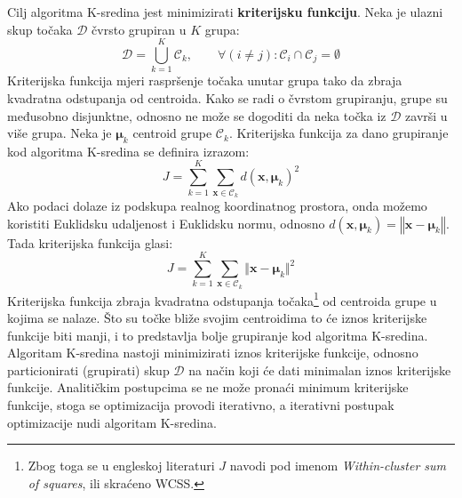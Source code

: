 \documentclass[times, utf8, zavrsni]{fer}
\begin{document}
Cilj algoritma K-sredina jest minimizirati \textbf{kriterijsku funkciju}. Neka je ulazni skup točaka $\mathcal{D}$ čvrsto grupiran u $K$ grupa:
\[\mathcal{D} = \bigcup_{k=1}^{K} \mathcal{C}_k, \qquad \forall \left(i \neq j\right) :  \mathcal{C}_i \cap \mathcal{C}_j = \emptyset\]
Kriterijska funkcija mjeri raspršenje točaka unutar grupa tako da zbraja kvadratna odstupanja od centroida.
Kako se radi o čvrstom grupiranju, grupe su međusobno disjunktne, odnosno ne može se dogoditi da neka točka iz $\mathcal{D}$ završi u više grupa. Neka je $\boldsymbol{\mu}_k$ centroid grupe $\mathcal{C}_k$. Kriterijska funkcija za dano grupiranje kod algoritma K-sredina se definira izrazom:
\[J = \sum_{k=1}^{K} \sum_{\mathbf{x} \in \mathcal{C}_k} 
d \left(\mathbf{x}, \boldsymbol{\mu}_k\right)^2\]
Ako podaci dolaze iz podskupa realnog koordinatnog prostora, onda možemo koristiti Euklidsku udaljenost i Euklidsku normu, odnosno
$d \left(\mathbf{x}, \boldsymbol{\mu}_k\right) = \left\Vert \mathbf{x} - \boldsymbol{\mu}_k \right\Vert$. Tada kriterijska funkcija glasi:
\[J = \sum_{k=1}^{K} \sum_{\mathbf{x} \in \mathcal{C}_k} 
\Vert \mathbf{x} - \boldsymbol{\mu}_k \Vert^2\]
Kriterijska funkcija zbraja kvadratna odstupanja točaka\footnote{Zbog toga se u engleskoj literaturi $J$ navodi pod imenom \emph{Within-cluster sum of squares}, ili skraćeno WCSS.} od centroida grupe u kojima se nalaze. Što su točke bliže svojim centroidima to će iznos kriterijske funkcije biti manji, i to predstavlja bolje grupiranje kod algoritma K-sredina. Algoritam K-sredina nastoji minimizirati iznos kriterijske funkcije, odnosno particionirati (grupirati) skup $\mathcal{D}$ na način koji će dati minimalan iznos kriterijske funkcije. Analitičkim postupcima se ne može pronaći minimum kriterijske funkcije, stoga se optimizacija provodi iterativno, a iterativni postupak optimizacije nudi algoritam K-sredina.
\end{document}
